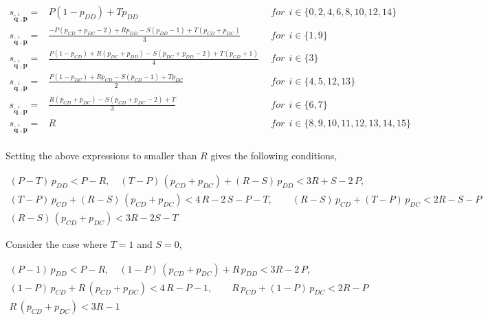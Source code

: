 \documentclass{article}
\theoremstyle{definition}
\begin{document}
\begin{equation*}
  \begin{array}{lcl}
  s_{\mathbf{\tilde{q}}^{i}, \mathbf{p}} = & P (1 - p_{DD}) + T p_{DD} & ~~for~~ i \in \{0, 2, 4, 6, 8, 10, 12, 14\} \\ [0.3cm]
  s_{\mathbf{\tilde{q}}^{i}, \mathbf{p}} = & \frac{-P(p_{CD} + p_{DC} - 2) + Rp_{DD} - S(p_{DD} - 1) + T(p_{CD} + p_{DC})}{3} & ~~for~~ i \in \{1, 9\} \\ [0.3cm]
  s_{\mathbf{\tilde{q}}^{i}, \mathbf{p}} = & \frac{P(1 - p_{CD}) + R(p_{DC} + p_{DD}) - S(p_{DC} + p_{DD} - 2) + T(p_{CD} + 1)}{4} & ~~for~~ i \in \{3\} \\ [0.3cm]
  s_{\mathbf{\tilde{q}}^{i}, \mathbf{p}} = & \frac{P(1 - p_{DC}) + Rp_{CD} - S(p_{CD} - 1) + Tp_{DC}}{2} & ~~for~~ i \in \{4, 5, 12, 13\} \\ [0.3cm]
  s_{\mathbf{\tilde{q}}^{i}, \mathbf{p}} = & \frac{R(p_{CD} + p_{DC}) - S(p_{CD} + p_{DC} - 2) + T}{3} & ~~for~~ i \in \{6, 7\} \\ [0.3cm]
  s_{\mathbf{\tilde{q}}^{i}, \mathbf{p}} = & R & ~~for~~ i \in \{8, 9, 10, 11, 12, 13, 14, 15\} \\ [0.3cm]
\end{array}
\end{equation*}

Setting the above expressions to smaller than $R$ gives the following conditions,

\begin{equation*}
  \begin{array}{c}
  (P - T)\, p_{DD} < P - R, 
  \quad (T - P) \, (p_{CD} + p_{DC}) + (R - S)\,p_{DD} < 3 R + S - 2\,P, \\[0.4cm]
  (T - P)\, p_{CD} + (R - S)\, (p_{CD} + p_{DC}) < 4\,R - 2\,S - P - T,
  \qquad \left(R - S\right)\, p_{CD} + \left(T - P\right)\,p_{DC} < 2 R - S - P \\[0.4cm]
  (R - S)\,(p_{CD} + p_{DC}) < 3 R - 2 S - T
\end{array}
\end{equation*}

Consider the case where $T=1$ and $S=0$,

\begin{equation*}
  \begin{array}{c}
  (P - 1)\, p_{DD} < P - R, 
  \quad (1 - P) \, (p_{CD} + p_{DC}) + R\,p_{DD} < 3 R - 2\,P, \\[0.4cm]
  (1 - P)\, p_{CD} + R\, (p_{CD} + p_{DC}) < 4\,R - P - 1,
  \qquad R \, p_{CD} + \left(1 - P\right)\,p_{DC} < 2 R - P \\[0.4cm]
  R\,(p_{CD} + p_{DC}) < 3 R - 1
\end{array}
\end{equation*}
\end{document}
